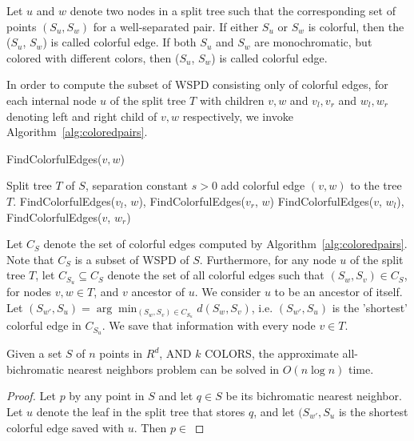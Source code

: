 \documentclass[a4paper,UKenglish,cleveref, autoref, thm-restate]{lipics-v2021}
\begin{document}
\begin{definition}
Let $u$ and $w$ denote two nodes in a split tree such that the corresponding 
set of points $(S_u, S_w)$ for a well-separated pair. If either $S_u$ or $S_w$ is colorful, then the ($S_u$, $S_w$) is called
colorful edge. If both $S_u$ and $S_w$ are monochromatic, but colored with different colors, then ($S_u$, $S_w$) is called colorful edge. 
\end{definition}
In order to compute the subset of WSPD consisting only of colorful edges, for each internal node $u$ of the split tree $T$ with
children $v,w$ and $v_l, v_r$ and $w_l, w_r$ denoting left and right child of $v,w$ respectively, we invoke Algorithm~\ref{alg:coloredpairs}. 
\begin{algorithm}
\caption{FindColorfulEdges($v, w$)}\label{alg:coloredpairs}
\begin{algorithmic}
\Require Split tree $T$ of $S$, separation constant $s>0$
    \State add colorful edge $(v, w)$ to the tree $T$.
    \State FindColorfulEdges($v_l$, $w$), FindColorfulEdges($v_r$, $w$)
\Else
    \State FindColorfulEdges($v$, $w_l$), FindColorfulEdges($v$, $w_r$)
\EndIf
\end{algorithmic}
\end{algorithm}
Let $C_S$ denote the set of colorful edges computed by Algorithm~\ref{alg:coloredpairs}. 
Note that $C_S$ is a subset of WSPD of $S$. Furthermore, for 
any node $u$ of the split tree $T$, let $C_{S_u}\subseteq C_S$ denote the
set of all colorful edges such that $(S_w, S_v)\in C_S$, for nodes $v, w \in T$, and 
$v$ ancestor of $u$. We 
consider $u$ to be an ancestor of itself. 
Let $(S_{w'}, S_u) = \arg\min_{(S_w, S_v)\in C_{S_u}} d(S_w, S_v)$, i.e. $(S_{w'}, S_u)$ is 
the 'shortest' colorful edge in $C_{S_u}$. We save that information with every node $v\in T$. 
\begin{theorem}
Given a set $S$ of $n$ points in $R^d$, AND $k$ COLORS,  the approximate 
all-bichromatic nearest neighbors problem can be solved in $O(n \log n)$ time. 
\end{theorem}
\begin{proof}
Let $p$ by any point in $S$ and let $q\in S$ be its bichromatic nearest neighbor. Let $u$
denote the leaf in the split tree that stores $q$, and let $(S_{w'}, S_u$ is the 
shortest colorful edge saved with $u$. Then $p\in $
\end{proof}
\end{document}
